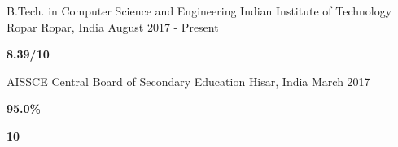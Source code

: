 

\begin{cventries}

  \cventry
    {B.Tech. in Computer Science and Engineering} %
    {Indian Institute of Technology Ropar} %
    {Ropar, India} %
    {August 2017 - Present} %
    {
      \setlength\multicolsep{-12pt}
      \begin{multicols}{2}
      \begin{cvschool} %
        \item[] \textbf{8.39/10}
      \end{cvschool}
      \end{multicols}
    }


\cvedu
    {AISSCE} %
    {Central Board of Secondary Education} %
    {Hisar, India} %
    {March 2017} %
    {
      \setlength\multicolsep{-10pt}
      \begin{multicols}{2}
      \begin{cvschool} %
        \item[] \textbf{95.0\%}
        \item[]  \textbf{10}
      \end{cvschool}
      \end{multicols}
    }


\end{cventries}
